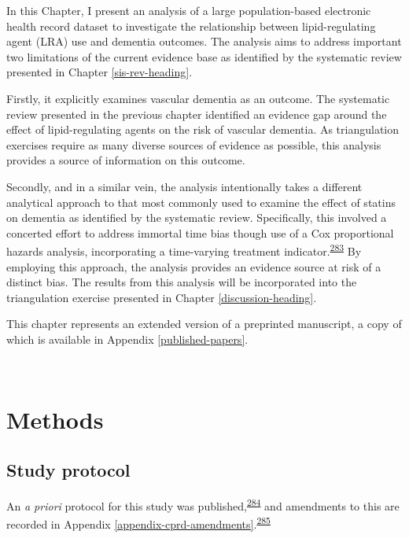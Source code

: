 \documentclass[a4paper, twoside]{templates/ociamthesis}
\begin{document}
In this Chapter, I present an analysis of a large population-based electronic health record dataset to investigate the relationship between lipid-regulating agent (LRA) use and dementia outcomes. The analysis aims to address important two limitations of the current evidence base as identified by the systematic review presented in Chapter \ref{sis-rev-heading}.

Firstly, it explicitly examines vascular dementia as an outcome. The systematic review presented in the previous chapter identified an evidence gap around the effect of lipid-regulating agents on the risk of vascular dementia. As triangulation exercises require as many diverse sources of evidence as possible, this analysis provides a source of information on this outcome.

Secondly, and in a similar vein, the analysis intentionally takes a different analytical approach to that most commonly used to examine the effect of statins on dementia as identified by the systematic review. Specifically, this involved a concerted effort to address immortal time bias though use of a Cox proportional hazards analysis, incorporating a time-varying treatment indicator.\textsuperscript{\protect\hyperlink{ref-suissa2008}{283}} By employing this approach, the analysis provides an evidence source at risk of a distinct bias. The results from this analysis will be incorporated into the triangulation exercise presented in Chapter \ref{discussion-heading}.

This chapter represents an extended version of a preprinted manuscript, a copy of which is available in Appendix \ref{published-papers}.

~

\hypertarget{methods-1}{%
\section{Methods}\label{methods-1}}

\hypertarget{study-protocol}{%
\subsection{Study protocol}\label{study-protocol}}

An \emph{a priori} protocol for this study was published,\textsuperscript{\protect\hyperlink{ref-walker2016}{284}} and amendments to this are recorded in Appendix \ref{appendix-cprd-amendments}.\textsuperscript{\protect\hyperlink{ref-vonelm2008}{285}}

~
\end{document}
